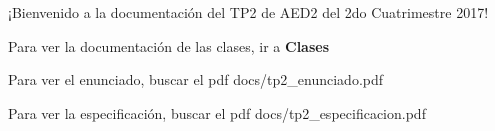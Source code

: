 ¡\-Bienvenido a la documentación del T\-P2 de A\-E\-D2 del 2do Cuatrimestre 2017!


\begin{DoxyItemize}
\item Para ver la documentación de las clases, ir a {\bfseries Clases}
\item Para ver el enunciado, buscar el pdf {\ttfamily docs/tp2\-\_\-enunciado.\-pdf}
\item Para ver la especificación, buscar el pdf {\ttfamily docs/tp2\-\_\-especificacion.\-pdf} 
\end{DoxyItemize}